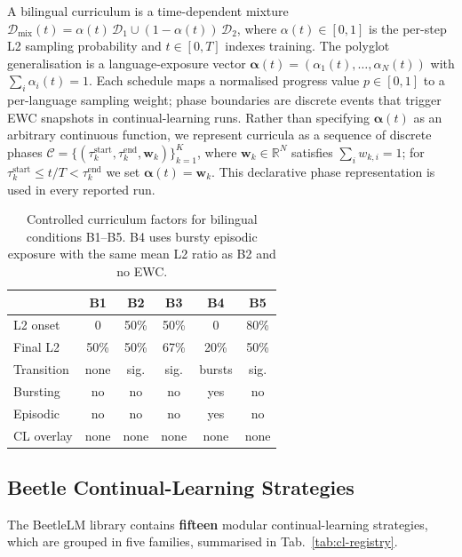 \documentclass[11pt]{article}
\newcommand{\beetle}{Beetle} %
\begin{document}
A bilingual curriculum is a time-dependent mixture $\mathcal{D}_{\text{mix}}(t) = \alpha(t)\,\mathcal{D}_1 \cup (1-\alpha(t))\,\mathcal{D}_2$, where $\alpha(t)\in[0,1]$ is the per-step L2 sampling probability and $t\in[0,T]$ indexes training. The polyglot generalisation is a language-exposure vector $\boldsymbol{\alpha}(t)=(\alpha_1(t),\ldots,\alpha_N(t))$ with $\sum_i \alpha_i(t)=1$. Each schedule maps a normalised progress value $p\in[0,1]$ to a per-language sampling weight; phase boundaries are discrete events that trigger EWC snapshots in continual-learning runs. Rather than specifying $\boldsymbol{\alpha}(t)$ as an arbitrary continuous function, we represent curricula as a sequence of discrete phases $\mathcal{C} = \{(\tau_k^{\text{start}}, \tau_k^{\text{end}}, \mathbf{w}_k)\}_{k=1}^{K}$, where $\mathbf{w}_k \in \mathbb{R}^N$ satisfies $\sum_i w_{k,i}=1$; for $\tau_k^{\text{start}} \le t/T < \tau_k^{\text{end}}$ we set $\boldsymbol{\alpha}(t) = \mathbf{w}_k$. This declarative phase representation is used in every reported run.
 
\begin{table}[t]
\centering
\small
\setlength{\tabcolsep}{3pt}
\begin{tabular}{lccccc}
\toprule
& \textbf{B1} & \textbf{B2} & \textbf{B3} & \textbf{B4} & \textbf{B5} \\
\midrule
L2 onset      & 0   & 50\% & 50\% & 0   & 80\% \\
Final L2      & 50\% & 50\% & 67\% & 20\% & 50\% \\
Transition    & none & sig. & sig. & bursts & sig. \\
Bursting      & no   & no   & no   & yes  & no \\
Episodic      & no   & no   & no   & yes  & no \\
CL overlay    & none & none & none & none & none \\
\bottomrule
\end{tabular}
\caption{Controlled curriculum factors for bilingual conditions B1--B5. B4 uses bursty episodic exposure with the same mean L2 ratio as B2 and no EWC.}
\label{tab:taxonomy}
\end{table}
 
 
\subsection{\beetle{} Continual-Learning Strategies}\label{sec:cl-strategies}
 
The BeetleLM library contains  \textbf{fifteen} modular continual-learning strategies, which are grouped in five families, summarised in Tab.~\ref{tab:cl-registry}.
\end{document}
